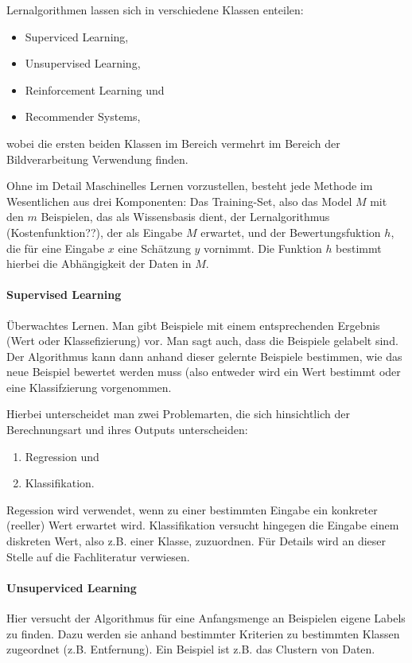 Lernalgorithmen lassen sich in verschiedene Klassen enteilen:
\begin{itemize}
\item Superviced Learning, 
\item Unsupervised Learning,
\item Reinforcement Learning und
\item Recommender Systems,
\end{itemize}
wobei die ersten beiden Klassen im Bereich vermehrt im Bereich der Bildverarbeitung Verwendung finden.

Ohne im Detail Maschinelles Lernen vorzustellen, besteht jede Methode im Wesentlichen aus drei Komponenten: Das Training-Set, also das Model $M$ mit den $m$ Beispielen, das als Wissensbasis dient, der Lernalgorithmus (Kostenfunktion??), der als Eingabe $M$ erwartet, und der Bewertungsfuktion $h$, die für eine Eingabe $x$ eine Schätzung $y$ vornimmt. Die Funktion $h$ bestimmt hierbei die Abhängigkeit der Daten in $M$.

\paragraph{Supervised Learning}
Überwachtes Lernen. Man gibt Beispiele mit einem entsprechenden Ergebnis (Wert oder Klassefizierung) vor. Man sagt auch, dass die Beispiele gelabelt sind. Der Algorithmus kann dann anhand dieser gelernte Beispiele bestimmen, wie das neue Beispiel bewertet werden muss (also entweder wird ein Wert bestimmt oder eine Klassifzierung vorgenommen.

Hierbei unterscheidet man zwei Problemarten, die sich hinsichtlich der Berechnungsart und ihres Outputs unterscheiden:
\begin{enumerate}
\item Regression und 
\item Klassifikation.
\end{enumerate}
Regession wird verwendet, wenn zu einer bestimmten Eingabe ein konkreter (reeller) Wert erwartet wird. Klassifikation versucht hingegen die Eingabe einem diskreten Wert, also z.B. einer Klasse, zuzuordnen. Für Details wird an dieser Stelle auf die Fachliteratur verwiesen.

\paragraph{Unsuperviced Learning}
Hier versucht der Algorithmus für eine Anfangsmenge an Beispielen eigene Labels zu finden. Dazu werden sie anhand bestimmter Kriterien zu bestimmten Klassen zugeordnet (z.B. Entfernung). Ein Beispiel ist z.B. das Clustern von Daten.

